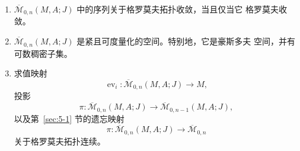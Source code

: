 \begin{theorem}\label{thm:5-6-6}
\begin{enumerate}[label=(\roman*),leftmargin=3em]
\item $\overline{\mathcal M}_{0,n}(M,A;J)$ 中的序列关于格罗莫夫拓扑收敛，当且仅当它
  格罗莫夫收敛。
\item $\overline{\mathcal M}_{0,n}(M,A;J)$ 是紧且可度量化的空间。特别地，它是豪斯多夫
  空间，并有可数稠密子集。
\item {}求值映射
  \[
    \operatorname{ev}_i:\overline{\mathcal M}_{0,n}(M,A;J)\longrightarrow M,
  \]
  投影
  \[
    \pi:\overline{\mathcal M}_{0,n}(M,A;J)
    \longrightarrow\overline{\mathcal M}_{0,n-1}(M,A;J),
  \]
  以及第~\ref{sec:5-1} 节的遗忘映射
  \[
    \pi:\overline{\mathcal M}_{0,n}(M,A;J)
    \longrightarrow\overline{\mathcal M}_{0,n}
  \]
  关于格罗莫夫拓扑连续。
\end{enumerate}
\end{theorem}


